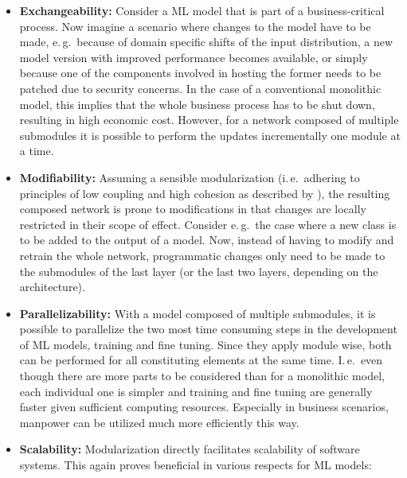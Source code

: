 \begin{itemize}
    \item \textbf{Exchangeability:} Consider a ML model that is part of a business-critical process. Now imagine a scenario where changes to the model have to be made, e.\,g.\ because of domain specific shifts of the input distribution, a new model version with improved performance becomes available, or simply because one of the components involved in hosting the former needs to be patched due to security concerns. In the case of a conventional monolithic model, this implies that the whole business process has to be shut down, resulting in high economic cost. However, for a network composed of multiple submodules it is possible to perform the updates incrementally one module at a time.
    \item \textbf{Modifiability:} Assuming a sensible modularization (i.\,e.\ adhering to principles of low coupling and high cohesion as described by \cite{Stevens1974-rf}), the resulting composed network is prone to modifications in that changes are locally restricted in their scope of effect. Consider e.\,g.\ the case where a new class is to be added to the output of a model. Now, instead of having to modify and retrain the whole network, programmatic changes only need to be made to the submodules of the last layer (or the last two layers, depending on the architecture).
    \item \textbf{Parallelizability:} With a model composed of multiple submodules, it is possible to parallelize the two most time consuming steps in the development of ML models, training and fine tuning. Since they apply module wise, both can be performed for all constituting elements at the same time. I.\,e.\ even though there are more parts to be considered than for a monolithic model, each individual one is simpler and training and fine tuning are generally faster given sufficient computing resources. Especially in business scenarios, manpower can be utilized much more efficiently this way.
    
    \item \textbf{Scalability:} Modularization directly facilitates scalability of software systems. This again proves beneficial in various respects for ML models:
        
\pagebreak
        

\end{itemize}
